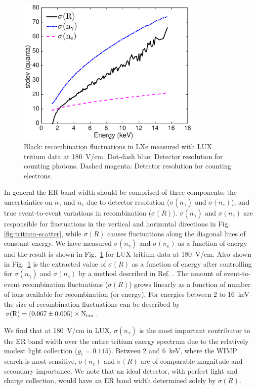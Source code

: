 \begin{figure}[t!]
\includegraphics[width=90mm]{fig/fig12.eps}
\caption{Black: recombination fluctuations in LXe measured with LUX tritium data at 180~V/cm. Dot-dash blue: Detector resolution for counting photons. Dashed magenta: Detector resolution for counting electrons.}
\label{fig:recomb-flucs}
\end{figure}


In general the ER band width should be comprised of three components: the uncertainties on  $n_{\gamma}$ and $n_e$  due to detector resolution ($ \sigma(n_{\gamma})$ and $ \sigma(n_e)$), and true event-to-event variations in recombination ($ \sigma(R)$). $ \sigma(n_{\gamma})$ and $ \sigma(n_e)$ are responsible for fluctuations in the vertical  and horizontal directions in Fig. \ref{fig:tritium-scatter},  while $ \sigma(R)$ causes fluctuations along the diagonal lines of constant energy. We have measured $ \sigma(n_{\gamma})$ and $ \sigma(n_e)$ as a function of energy and the result is shown in Fig.~\ref{fig:recomb-flucs} for LUX tritium data at 180~V/cm\cite{Dobi_Thesis}. Also shown in Fig.~\ref{fig:recomb-flucs} is the extracted value of $ \sigma(R)$ as a function of energy after controlling for $ \sigma(n_{\gamma})$ and $ \sigma(n_e)$ by a method described in Ref. \cite{Dobi_Thesis}. The amount of event-to-event recombination fluctuations ($ \sigma(R)$) grows linearly as a function of number of ions available for recombination (or energy). For energies between 2 to 16~keV the size of recombination fluctuations can be described by $\rm \sigma(R)=(0.067\pm0.005) \times N_{ion}$.

We find that at 180~V/cm in LUX, $ \sigma(n_{\gamma})$ is the most important contributor to the ER band width over the entire tritium energy spectrum due to the relatively modest light collection ($g_1 = 0.115$). Between 2 and 6~keV, where the WIMP search is most sensitive, $ \sigma(n_e)$ and $ \sigma(R)$ are of comparable magnitude and secondary importance. We note that an ideal detector, with perfect light and charge collection, would have an ER band width determined solely by $ \sigma(R)$. 


